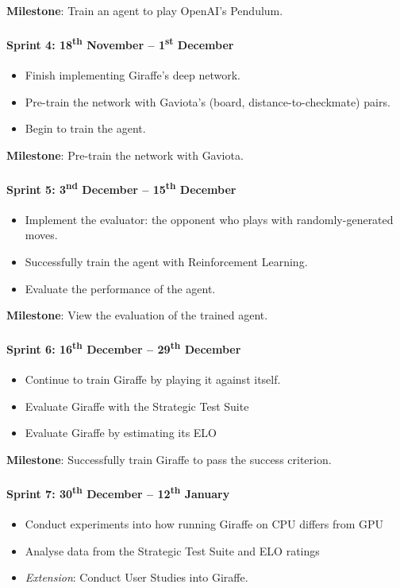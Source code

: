 \documentclass[a4paper]{article}
\begin{document}
\textbf{Milestone}: Train an agent to play OpenAI's Pendulum.

\paragraph{Sprint 4: 18\textsuperscript{th} November -- 1\textsuperscript{st} December}
\begin{itemize}
\item Finish implementing Giraffe's deep network.
\item Pre-train the network with Gaviota's (board, distance-to-checkmate) pairs.
\item Begin to train the agent.
\end{itemize}

\textbf{Milestone}: Pre-train the network with Gaviota.

\paragraph{Sprint 5: 3\textsuperscript{nd} December -- 15\textsuperscript{th} December}
\begin{itemize}
\item Implement the evaluator: the opponent who plays with randomly-generated moves.
\item Successfully train the agent with Reinforcement Learning.
\item Evaluate the performance of the agent.
\end{itemize}

\textbf{Milestone}: View the evaluation of the trained agent.

\paragraph{Sprint 6: 16\textsuperscript{th} December -- 29\textsuperscript{th} December}
\begin{itemize}
\item Continue to train Giraffe by playing it against itself.
\item Evaluate Giraffe with the Strategic Test Suite
\item Evaluate Giraffe by estimating its ELO
\end{itemize}

\textbf{Milestone}: Successfully train Giraffe to pass the success criterion.

\paragraph{Sprint 7: 30\textsuperscript{th} December -- 12\textsuperscript{th} January}
\begin{itemize}
\item Conduct experiments into how running Giraffe on CPU differs from GPU
\item Analyse data from the Strategic Test Suite and ELO ratings
\item \textit{Extension}: Conduct User Studies into Giraffe.
\end{itemize}
\end{document}
